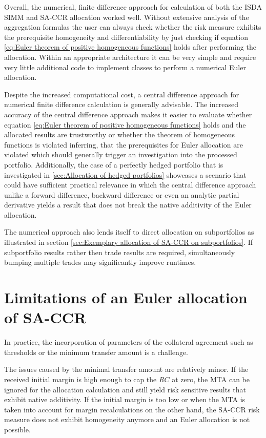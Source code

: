 \documentclass[../Thesis_AHoecherl.tex]{subfiles}
\begin{document}
    Overall, the numerical, finite difference approach for calculation of both the \gls{ISDA SIMM} and \gls{SA-CCR} allocation worked well. Without extensive analysis of the aggregation formulas the user can always check whether the risk measure exhibits the prerequisite homogeneity and differentiability by just checking if equation \ref{eq:Euler theorem of positive homogeneous functions} holds after performing the allocation. 
    Within an appropriate architecture it can be very simple and require very little additional code to implement classes to perform a numerical Euler allocation.
    
    Despite the increased computational cost, a central difference approach for numerical finite difference calculation is generally advisable.
    The increased accuracy of the central difference approach makes it easier to evaluate whether equation \ref{eq:Euler theorem of positive homogeneous functions} holds and the allocated results are trustworthy or whether the theorem of homogeneous functions is violated inferring, that the prerequisites for Euler allocation are violated which should generally trigger an investigation into the processed portfolio.
    Additionally, the case of a perfectly hedged portfolio that is investigated in \ref{sec:Allocation of hedged portfolios} showcases a scenario that could have sufficient practical relevance in which the central difference approach unlike a forward difference, backward difference or even an analytic partial derivative yields a result that does not break the native additivity of the Euler allocation.

    The numerical approach also lends itself to direct allocation on subportfolios as illustrated in section \ref{sec:Exemplary allocation of SA-CCR on subportfolios}.
    If subportfolio results rather then trade results are required, simultaneously bumping multiple trades may significantly improve runtimes.

    \section{Limitations of an Euler allocation of SA-CCR\label{Limitations of an Euler allocation of SA-CCR}}

    In practice, the incorporation of parameters of the collateral agreement such as thresholds or the minimum transfer amount is a challenge.

    The issues caused by the minimal transfer amount are relatively minor.
    If the received initial margin is high enough to cap the $RC$ at zero, the \gls{MTA} can be ignored for the allocation calculation and still yield risk sensitive results that exhibit native additivity. If the initial margin is too low or when the \gls{MTA} is taken into account for margin recalculations on the other hand, the \gls{SA-CCR} risk measure does not exhibit homogeneity anymore and an Euler allocation is not possible.
    
\end{document}
